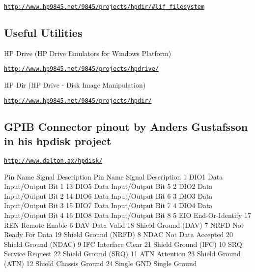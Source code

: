 \begin{DoxyItemize}
\item \href{http://www.hp9845.net/9845/projects/hpdir/#lif_filesystem}{\tt http\-://www.\-hp9845.\-net/9845/projects/hpdir/\#lif\-\_\-filesystem}
\end{DoxyItemize}

\subsection*{Useful Utilities}


\begin{DoxyItemize}
\item H\-P Drive (H\-P Drive Emulators for Windows Platform)
\begin{DoxyItemize}
\item \href{http://www.hp9845.net/9845/projects/hpdrive/}{\tt http\-://www.\-hp9845.\-net/9845/projects/hpdrive/}
\end{DoxyItemize}
\item H\-P Dir (H\-P Drive -\/ Disk Image Manipulation)
\begin{DoxyItemize}
\item \href{http://www.hp9845.net/9845/projects/hpdir/}{\tt http\-://www.\-hp9845.\-net/9845/projects/hpdir/}
\end{DoxyItemize}
\end{DoxyItemize}





\subsection*{G\-P\-I\-B Connector pinout by Anders Gustafsson in his hpdisk project}


\begin{DoxyItemize}
\item \href{http://www.dalton.ax/hpdisk/}{\tt http\-://www.\-dalton.\-ax/hpdisk/}
\end{DoxyItemize}


\begin{DoxyPre}
    Pin Name   Signal Description       Pin Name   Signal Description 
    1   DIO1   Data Input/Output Bit 1  13  DIO5   Data Input/Output Bit 5 
    2   DIO2   Data Input/Output Bit 2  14  DIO6   Data Input/Output Bit 6 
    3   DIO3   Data Input/Output Bit 3  15  DIO7   Data Input/Output Bit 7 
    4   DIO4   Data Input/Output Bit 4  16  DIO8   Data Input/Output Bit 8 
    5   EIO    End-Or-Identify          17  REN    Remote Enable 
    6   DAV    Data Valid               18  Shield Ground (DAV) 
    7   NRFD   Not Ready For Data       19  Shield Ground (NRFD) 
    8   NDAC   Not Data Accepted        20  Shield Ground (NDAC) 
    9   IFC    Interface Clear          21  Shield Ground (IFC) 
    10  SRQ    Service Request          22  Shield Ground (SRQ) 
    11  ATN    Attention                23  Shield Ground (ATN) 
    12  Shield Chassis Ground           24  Single GND Single Ground
\end{DoxyPre}






